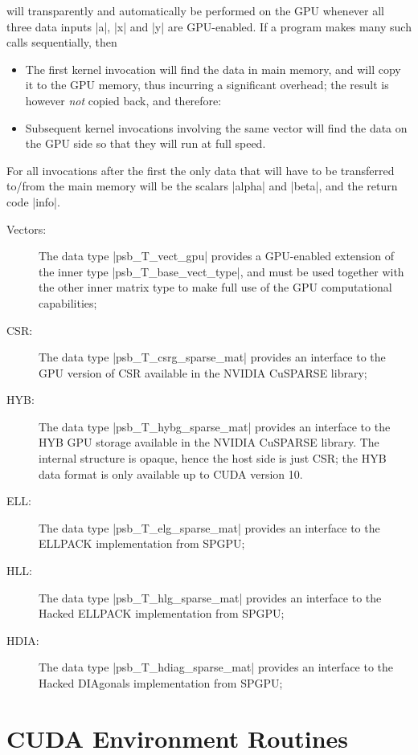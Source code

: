 \fi
will transparently and automatically be performed on the {GPU} whenever
all three data inputs \fortinline|a|, \fortinline|x|  and
\fortinline|y| are {GPU}-enabled. If a program makes many such calls
sequentially, then 
\begin{itemize}
\item The first kernel invocation will find the data in main memory,
  and will copy it to the {GPU} memory, thus incurring a significant
  overhead; the result is however \emph{not} copied back, and
  therefore:
\item Subsequent kernel invocations involving the same vector will
  find the data on the {GPU} side so that they will run at full
  speed.
\end{itemize}
For all invocations after the first the only data that will have to be
transferred to/from the main memory will be the scalars \fortinline|alpha|
and \fortinline|beta|, and the return code \fortinline|info|.  

\begin{description}
\item[Vectors:] The data type \fortinline|psb_T_vect_gpu| provides a
  GPU-enabled extension of the inner type \fortinline|psb_T_base_vect_type|,
  and must be used together with the other inner matrix type to make
  full use of the GPU computational capabilities;
\item[CSR:] The data type \fortinline|psb_T_csrg_sparse_mat| provides an
  interface to the GPU version of CSR available in the NVIDIA CuSPARSE
  library;
\item[HYB:] The data type \fortinline|psb_T_hybg_sparse_mat| provides an
  interface to the HYB GPU storage  available in the NVIDIA CuSPARSE
  library. The internal structure is opaque, hence the host side is
  just CSR; the HYB data format is only available up to CUDA version
  10. 
\item[ELL:] The data type \fortinline|psb_T_elg_sparse_mat| provides an
  interface to the  ELLPACK implementation from SPGPU;

\item[HLL:] The data type \fortinline|psb_T_hlg_sparse_mat| provides an
  interface to the  Hacked ELLPACK implementation from SPGPU;
\item[HDIA:] The data type \fortinline|psb_T_hdiag_sparse_mat| provides an
  interface to the  Hacked DIAgonals implementation from SPGPU;
\end{description}


\section{CUDA Environment Routines}
\label{sec:cudaenv}

